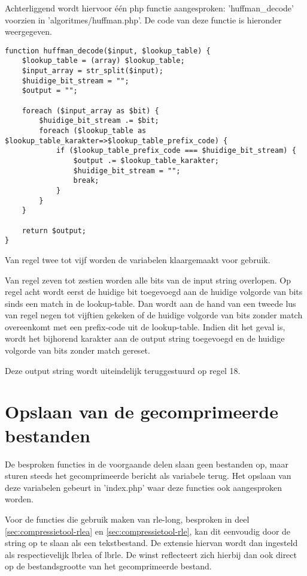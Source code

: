 Achterliggend wordt hiervoor één \gls{php} functie aangesproken: 'huffman\_decode' voorzien in 'algoritmes/huffman.php'. De code van deze functie is hieronder weergegeven.

\begin{lstlisting}
function huffman_decode($input, $lookup_table) {
	$lookup_table = (array) $lookup_table;
	$input_array = str_split($input);
	$huidige_bit_stream = "";
	$output = "";
	
	foreach ($input_array as $bit) {
		$huidige_bit_stream .= $bit;
		foreach ($lookup_table as $lookup_table_karakter=>$lookup_table_prefix_code) {
			if ($lookup_table_prefix_code === $huidige_bit_stream) {
				$output .= $lookup_table_karakter;
				$huidige_bit_stream = "";
				break;
			}
		}
	}
	
	return $output;
}
\end{lstlisting}

Van regel twee tot vijf worden de variabelen klaargemaakt voor gebruik. 

Van regel zeven tot zestien worden alle \glspl{bit} van de input string overlopen. Op regel acht wordt eerst de huidige \gls{bit} toegevoegd aan de huidige volgorde van \glspl{bit} sinds een match in de \gls{lookup-table}. Dan wordt aan de hand van een tweede lus van regel negen tot vijftien gekeken of de huidige volgorde van \glspl{bit} zonder match overeenkomt met een \gls{prefix-code} uit de \gls{lookup-table}. Indien dit het geval is, wordt het bijhorend karakter aan de output \gls{string} toegevoegd en de huidige volgorde van \glspl{bit} zonder match gereset. 

Deze output \gls{string} wordt uiteindelijk teruggestuurd op regel 18.

\section{Opslaan van de gecomprimeerde bestanden}
\label{sec:compressietool-opslaan}

De besproken functies in de voorgaande delen slaan geen bestanden op, maar sturen steeds het gecomprimeerde bericht als variabele terug. Het opslaan van deze variabelen gebeurt in 'index.php' waar deze functies ook aangesproken worden. 

Voor de functies die gebruik maken van \gls{rle-long}, besproken in deel \ref{sec:compressietool-rlea} en \ref{sec:compressietool-rle}, kan dit eenvoudig door de \gls{string} op te slaan als een tekstbestand. De extensie hiervan wordt dan ingesteld als respectievelijk \gls{lbrlea} of \gls{lbrle}. De winst reflecteert zich hierbij dan ook direct op de bestandsgrootte van het gecomprimeerde bestand.

